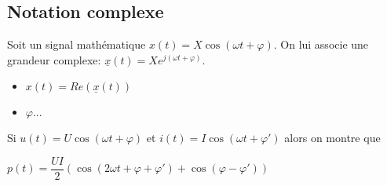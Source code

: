 %
%
%
%
%

\subsection{Notation complexe}

\begin{defi}
Soit un signal mathématique $x(t)=X \cos\left( \omega t + \varphi \right)$. On lui associe 
une grandeur complexe: $\underline{x}(t)=X e^{j\left(\omega t + \varphi\right)}$.
\end{defi}

\begin{resultat}
\begin{itemize}
\item $x(t) = Re\left(\underline{x}(t)\right)$
\item $\varphi ... $
\end{itemize}
\end{resultat}



\begin{resultat}
Si $u(t)=U\cos\left(\omega t + \varphi\right)$
et 
$i(t)=I\cos\left(\omega t + \varphi'\right)$ 
alors on montre que 

$p(t)=\dfrac{UI}{2}\left( \cos\left(2\omega t + \varphi + \varphi' \right)+\cos\left(\varphi -\varphi' \right)\right)$
\end{resultat}